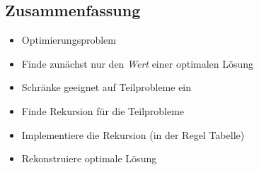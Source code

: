 \subsection{Zusammenfassung}
\begin{itemize}
 \item Optimierungsproblem
 \item Finde zunächst nur den \emph{Wert} einer optimalen Lösung
 \item Schränke geeignet auf Teilprobleme ein
 \item Finde Rekursion für die Teilprobleme
 \item Implementiere die Rekursion (in der Regel Tabelle)
 \item Rekonstruiere optimale Lösung
\end{itemize}

